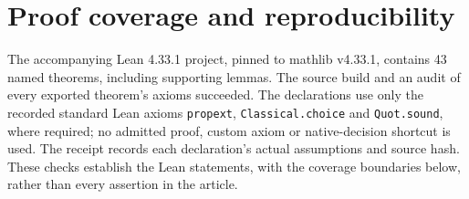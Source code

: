 \documentclass[11pt,a4paper]{amsart}
\theoremstyle{definition}
\theoremstyle{remark}
\begin{document}
\clearpage
\section{Proof coverage and reproducibility}
\label{app:coverage}

The accompanying Lean 4.33.1 project, pinned to mathlib v4.33.1, contains 43 named theorems, including supporting lemmas. The source build and an audit of every exported theorem's axioms succeeded. The declarations use only the recorded standard Lean axioms \texttt{propext}, \texttt{Classical.choice} and \texttt{Quot.sound}, where required; no admitted proof, custom axiom or native-decision shortcut is used. The receipt records each declaration's actual assumptions and source hash. These checks establish the Lean statements, with the coverage boundaries below, rather than every assertion in the article.
\end{document}
